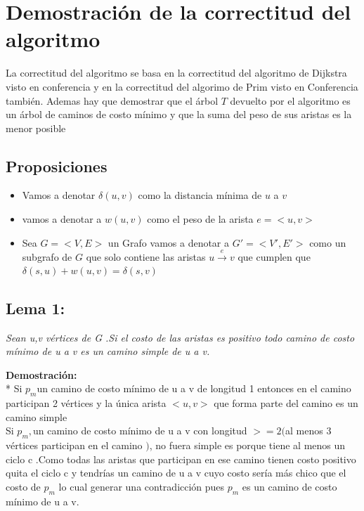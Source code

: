 \documentclass{article}
\begin{document}
    \section{Demostraci\'on  de la correctitud del algoritmo}

    \noindent La correctitud del algoritmo se basa en la correctitud del algoritmo de Dijkstra visto en conferencia 
    y en la correctitud del algorimo de Prim visto en Conferencia tambi\'en. Ademas hay que demostrar que el \'arbol $T$ 
    devuelto por el algoritmo es un \'arbol de caminos de costo m\'inimo y que la suma del peso de sus aristas es la menor posible  
    
    \subsection*{Proposiciones }
    \begin{itemize}
        \item Vamos a denotar $\delta\left(u,v\right)$ como la distancia m\'inima de $u$ a $v$ 
        \item vamos a denotar a $w(u,v)$ como el peso de la arista $e= <u,v>$ 
        \item Sea $G = <V,E>$ un Grafo  vamos a denotar a $G' = <V',E'>$ como un subgrafo de $G$ que solo contiene las aristas $ u \xrightarrow[]{e} v$ 
        que cumplen que $\delta\left(s,u\right) + w \left(u,v\right) = \delta\left(s,v\right)$   
    \end{itemize}

    \subsection*{Lema 1:}

    \textit{Sean u,v v\'ertices de G  .Si el costo de las aristas es positivo todo camino de costo m\'inimo de u a v es un camino simple de u a v.}
    
    \vspace*{0.3cm} 

    \noindent \textbf{Demostraci\'on:}
    \\*
    Si $p_{m}$un camino de costo m\'inimo de u a v de longitud 1 entonces en el camino participan 2 v\'ertices y la \'unica arista $<u,v>$
    que forma parte del camino es un camino simple\\ 
    Si $p_{m},$un camino de costo m\'inimo de u a v con longitud $>=2$$($al menos 3 v\'ertices participan en el camino $)$, no fuera simple es 
    porque tiene al menos un ciclo c .Como todas las aristas que participan en ese camino tienen costo positivo quita el ciclo c y tendr\'ias 
    un camino de u a v cuyo costo ser\'ia m\'as chico que el costo de $p_{m}$ lo cual generar
    una contradicci\'on pues $p_{m}$ es un camino de costo m\'inimo de u a v.\\
    
\end{document}
